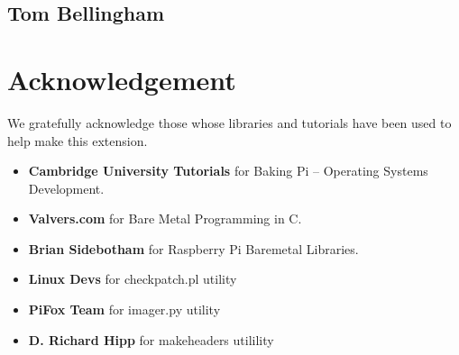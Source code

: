 \documentclass[11pt]{article}
\begin{document}
\subsection{Tom Bellingham}

\section{Acknowledgement}

We gratefully acknowledge those  whose libraries and tutorials have been used
to help make this extension.

\begin{itemize}[noitemsep,topsep=0pt]
  \item \textbf{Cambridge University Tutorials} for Baking Pi –
    Operating Systems Development.
  \item \textbf{Valvers.com} for Bare Metal Programming in C.
  \item \textbf{Brian Sidebotham} for Raspberry Pi Baremetal Libraries.
  \item \textbf{Linux Devs} for checkpatch.pl utility
  \item \textbf{PiFox Team} for imager.py utility
  \item \textbf{D. Richard Hipp} for makeheaders utilility
\end{itemize}
\end{document}
